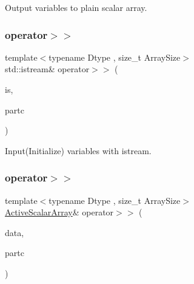 Output variables to plain scalar array. 

\mbox{\label{classparticles_a76cf6d70e3bd56bf748fbbde009dd88e}} 
\subsubsection{\texorpdfstring{operator$>$$>$}{operator>>}\hspace{0.1cm}{\footnotesize\ttfamily [1/2]}}
{\footnotesize\ttfamily template$<$typename Dtype , size\+\_\+t Array\+Size$>$ \\
std\+::istream\& operator$>$$>$ (\begin{DoxyParamCaption}\item[{std\+::istream \&}]{is,  }\item[{\mbox{\hyperlink{classparticles}{particles}}$<$ Dtype, Array\+Size $>$ \&}]{partc }\end{DoxyParamCaption})\hspace{0.3cm}{\ttfamily [friend]}}



Input(\+Initialize) variables with istream. 

\mbox{\label{classparticles_ae3639692fea4ca2a3f9d017c8f0f8dc2}} 
\subsubsection{\texorpdfstring{operator$>$$>$}{operator>>}\hspace{0.1cm}{\footnotesize\ttfamily [2/2]}}
{\footnotesize\ttfamily template$<$typename Dtype , size\+\_\+t Array\+Size$>$ \\
\mbox{\hyperlink{classparticles_a1a7d26adb64aacc4201e6bbb9de64c47}{Active\+Scalar\+Array}}\& operator$>$$>$ (\begin{DoxyParamCaption}\item[{\mbox{\hyperlink{classparticles_a1a7d26adb64aacc4201e6bbb9de64c47}{Active\+Scalar\+Array}} \&}]{data,  }\item[{\mbox{\hyperlink{classparticles}{particles}}$<$ Dtype, Array\+Size $>$ \&}]{partc }\end{DoxyParamCaption})\hspace{0.3cm}{\ttfamily [friend]}}



